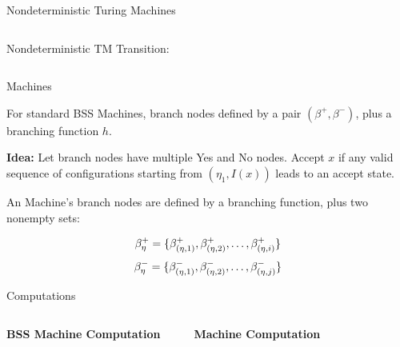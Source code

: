 \documentclass[c]{beamer}
\begin{document}
\begin{frame}{Nondeterministic Turing Machines}

  \begin{columns}

    Nondeterministic TM Transition:
       

    \begin{center}
      \scaletopagewidth{\ndetercomptm{}}
    \end{center}
  \end{columns}
\end{frame}

\begin{frame}{\ndet Machines}

  For standard BSS Machines, branch nodes defined by a pair
  $(\beta^+, \beta^-)$, plus a branching function $h$.\pause

  \vspace{\baselineskip}

  \textbf{Idea:} Let branch nodes have multiple Yes and No nodes.
  Accept $x$ if any valid sequence of configurations starting from
  $(\eta_1, I(x))$ leads to an accept state.\pause
  
  \vspace{\baselineskip}

  An \ndet Machine's branch nodes are defined by a branching function,
  plus two nonempty sets:

  $$\beta^+_\eta = \{\beta_{(\eta, 1)}^+, \beta_{(\eta, 2)}^+, \ldots, \beta_{(\eta, i)}^+\}$$
  $$\beta_\eta^- = \{\beta_{(\eta, 1)}^-, \beta_{(\eta, 2)}^-, \ldots, \beta_{(\eta, j)}^-\}$$
\end{frame}

\begin{frame}{\ndet Computations}
  
  \begin{columns}
    
    \textbf{BSS Machine Computation}
    \begin{center}
      \detercompbss{}
    \end{center}
    \textbf{\ndet Machine Computation}
    \begin{center}
      \scaletopagewidth{\ndetercompbss{}}
    \end{center}
  \end{columns}

\end{frame}
\end{document}
